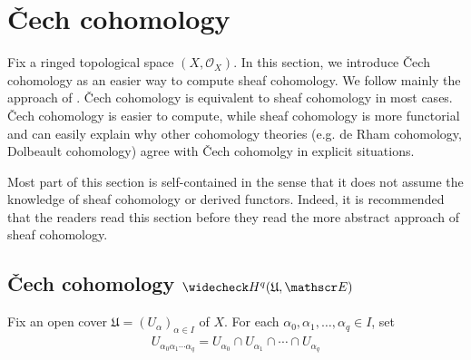 \documentclass[12pt,b5paper,notitlepage]{report}
\theoremstyle{definition}
\theoremstyle{plain}
\newcommand{\fk}{\mathfrak}
\newcommand{\wch}{\widecheck}
\newcommand{\scr}{\mathscr}
\numberwithin{equation}{section}
\begin{document}
\section{\v Cech cohomology}\label{lb323}

Fix a ringed topological space $(X,\scr O_X)$. In this section, we introduce \v Cech cohomology as an easier way to compute sheaf cohomology. We follow mainly the approach of \cite{Dem}. \v Cech cohomology is equivalent to sheaf cohomology in most cases. \v Cech cohomology is easier to compute, while sheaf cohomology is more functorial and can easily explain why other cohomology theories (e.g. de Rham cohomology, Dolbeault cohomology) agree with \v Cech cohomolgy in explicit situations.   

Most part of this section is self-contained in the sense that it does not assume the knowledge of sheaf cohomology or derived functors. Indeed, it is recommended that the readers read this section before they read the more abstract approach of sheaf cohomology. 



\subsection{\v Cech cohomology $\wch H^q(\fk U,\scr E)$}


Fix an open cover $\fk U=(U_\alpha)_{\alpha\in I}$ of $X$. For each $\alpha_0,\alpha_1,\dots,\alpha_q\in I$, set
\begin{align*}
U_{\alpha_0\alpha_1\cdots\alpha_q}=U_{\alpha_0}\cap U_{\alpha_1}\cap\cdots\cap U_{\alpha_q}
\end{align*}
\end{document}

